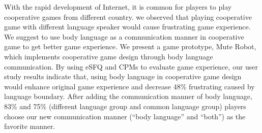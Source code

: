 
With the rapid development of Internet, it is common for players to play cooperative games from different country. 
we observed that playing cooperative game with different language speaker would cause frustrating game experience.
We suggest to use body language as a communication manner in cooperative game to get better game experience. 
We present a game prototype, Mute Robot, which implements cooperative game design through body language communication.
By using eSFQ\cite{eSFQ} and CPMs\cite{CPMs} to evaluate game experience, our user study results indicate that, using body language in cooperative game design would enhance original game experience and decrease 48\% frustrating caused by language boundary.
After adding the communication manner of body language, 83\% and 75\% (different language group and common language group) players choose our new communication manner (``body language'' and ``both'') as the favorite manner. 